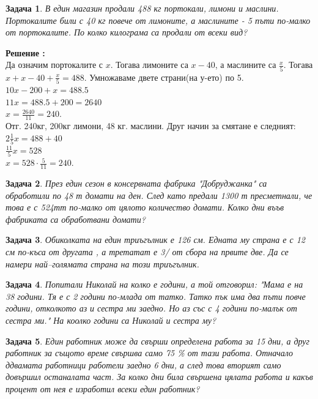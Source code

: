 \documentclass{article}
\newtheorem{problem}{Задача}
\newcounter{solution}
\newcommand\solution{%
	\stepcounter{solution}%
	\textbf{Решение :}\\%
}
\begin{document}
\begin{problem}
	В един магазин продали 488 кг портокали, лимони и маслини. Портокалите били с 40 кг повече от лимоните, а маслините - 5 пъти по-малко от портокалите. По колко килограма са продали от всеки вид?
\end{problem}
\solution Да означим портокалите с $x$. Тогава лимоните са $x-40 $, а маслините са $\frac{x}{5} $. Тогава $x + x - 40 + \frac{x}{5} = 488.$ Умножаваме двете страни(на у-ето) по 5. \\ $10x - 200 + x = 488.5 $ \\
$11x  = 488.5 + 200 = 2640 $ \\
$x = \frac{2640}{11} = 240 $. \\
Отг. 240кг, 200кг лимони, 48 кг. маслини.
Друг начин за смятане е следният:
$2\frac{1}{5}x = 488 + 40 $ \\
$ \frac{11}{5}x = 528 $ \\
$ x = 528 \cdot \frac{5}{11} = 240.$

\begin{problem}
	През един сезон в консервната фабрика "Добруджанка" са обработили по 48 т домати на ден. След като предали 1300 т пресметнали, че това е с 524тт по-малко от цялото количество домати. Колко дни въъв фабриката са обработвани домати?
\end{problem}


\begin{problem}
	Обиколката на един триъгълник е 126 см. Едната му страна е с 12 см по-къса от другата , а третатат е 3/ от сбора на првите две. Да се намери най--голямата страна на този триъгълник.
\end{problem}


\begin{problem}
	Попитали Николай на колко е години, а той отговорил: "Мама е на 38 години. Тя е с 2 години по-млада от татко. Татко пък има два пъти повче години, отколкото аз и сестра ми заедно. Но аз със с 4 години по-малък от сестра ми." На коолко години са Николай и сестра му?
\end{problem}


\begin{problem}
	Един работник може да свърши определена работа за 15 дни, а друг работник за същото време свършва само 75 \% от тази работа. Отначало ддвамата  работници работели заедно 6 дни, а след това вторият само довършил останалата част. За колко дни била свършена цялата работа и какъв процент от нея е изработил всеки един работник?
\end{problem}
\end{document}
